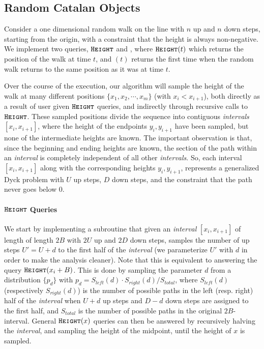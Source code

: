 \subsection{Random Catalan Objects}
\label{sec:overview_catalan_objects}
Consider a one dimensional random walk on the line with $n$ up and $n$ down steps, starting from the origin,
with a constraint that the height is always non-negative.
We implement two queries, $\texttt{\textsc{Height}}$ and , where $\texttt{\textsc{Height}}(t)$ which returns the position of the walk at time $t$,
and $(t)$ returns the first time when the random walk returns to the same position as it was at time $t$.

Over the course of the execution, our algorithm will sample the height of the walk at many different positions $\{ x_1, x_2,\cdots, x_m\}$
(with $x_i<x_{i+1}$), both directly as a result of user given $\texttt{\textsc{Height}}$ queries, and indirectly through recursive calls to $\texttt{\textsc{Height}}$.
These sampled positions divide the sequence into contiguous \emph{intervals} $[x_i,x_{i+1}]$,
where the height of the endpoints $y_i, y_{i+1}$ have been sampled, but none of the intermediate heights are known.
The important observation is that, since the beginning and ending heights are known,
the section of the path within an \emph{interval} is completely independent of all other \emph{intervals}.
So, each interval $[x_i,x_{i+1}]$ along with the corresponding heights $y_i,y_{i+1}$,
represents a generalized Dyck problem with $U$ up steps, $D$ down steps, and the constraint that the path never goes below $0$.

\paragraph*{$\texttt{\textsc{Height}}$ Queries}
\label{par:height_queries}
We start by implementing a subroutine that given an \emph{interval} $[x_i,x_{i+1}]$ of length of length $2B$ with $2U$ up and $2D$ down steps,
samples the number of up steps $U'=U+d$ to the first half of the \emph{interval}
(we parameterize $U'$ with $d$ in order to make the analysis cleaner).
Note that this is equivalent to answering the query $\texttt{\textsc{Height}}(x_i+B)$.
This is done by sampling the parameter $d$ from a distribution $\{ p_d\}$ with $p_d = S_{left}(d)\cdot S_{right}(d)/S_{total}$,
where $S_{left}(d)$ (respectively $S_{right}(d)$) is the number of possible paths in the left (resp. right) half of the \emph{interval} when
$U+d$ up steps and $D-d$ down steps are assigned to the first half, and $S_{total}$ is the number of possible paths in the original $2B$-interval.
General $\texttt{\textsc{Height}}(x)$ queries can then be answered by recursively halving the \emph{interval},
and sampling the height of the midpoint, until the height of $x$ is sampled.

